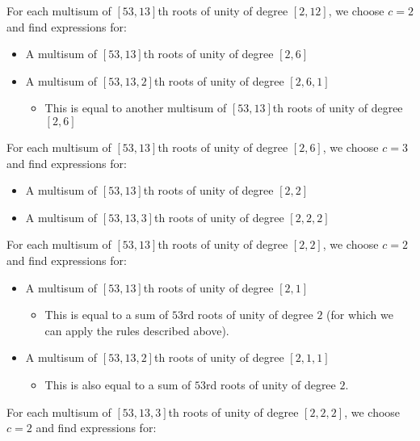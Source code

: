 \documentclass{article}
\begin{document}
        For each multisum of $ [53, 13] $th roots of unity of degree $ [2, 12] $, we choose $ c = 2 $ and find expressions for:
        \begin{itemize}
            \item A multisum of $ [53, 13] $th roots of unity of degree $ [2, 6] $
            \item A multisum of $ [53, 13, 2] $th roots of unity of degree $ [2, 6, 1] $
            \begin{itemize}
                \item This is equal to another multisum of $ [53, 13] $th roots of unity of degree $ [2, 6] $
            \end{itemize}
        \end{itemize}
        For each multisum of $ [53, 13] $th roots of unity of degree $ [2, 6] $, we choose $ c = 3 $ and find expressions for:
        \begin{itemize}
            \item A multisum of $ [53, 13] $th roots of unity of degree $ [2, 2] $
            \item A multisum of $ [53, 13, 3] $th roots of unity of degree $ [2, 2, 2] $
        \end{itemize}
        For each multisum of $ [53, 13] $th roots of unity of degree $ [2, 2] $, we choose $ c = 2 $ and find expressions for:
        \begin{itemize}
            \item A multisum of $ [53, 13] $th roots of unity of degree $ [2, 1] $
            \begin{itemize}
                \item This is equal to a sum of $ 53 $rd roots of unity of degree $ 2 $ (for which we can apply the rules described above).
            \end{itemize}
            \item A multisum of $ [53, 13, 2] $th roots of unity of degree $ [2, 1, 1] $
            \begin{itemize}
                \item This is also equal to a sum of $ 53 $rd roots of unity of degree $ 2 $.
            \end{itemize}
        \end{itemize}
        For each multisum of $ [53, 13, 3] $th roots of unity of degree $ [2, 2, 2] $, we choose $ c = 2 $ and find expressions for:
\end{document}
